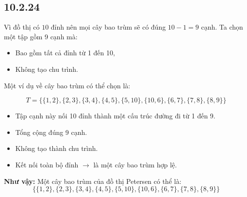 \documentclass{article}
\begin{document}
	\subsection*{10.2.24}
	Vì đồ thị có $10$ đỉnh nên mọi cây bao trùm sẽ có đúng $10 - 1 = 9$ cạnh. Ta chọn một tập gồm 9 cạnh mà:
	\begin{itemize}
		\item Bao gồm tất cả đỉnh từ 1 đến 10,
		\item Không tạo chu trình.
	\end{itemize}
	
	Một ví dụ về cây bao trùm có thể chọn là:
	
	\[
	T = \{\{1,2\}, \{2,3\}, \{3,4\}, \{4,5\}, \{5,10\}, \{10,6\}, \{6,7\}, \{7,8\}, \{8,9\}\}
	\]
	
	\begin{itemize}
		\item Tập cạnh này nối 10 đỉnh thành một cấu trúc đường đi từ 1 đến 9.
		\item Tổng cộng đúng 9 cạnh.
		\item Không tạo thành chu trình.
		\item Kết nối toàn bộ đỉnh $\rightarrow$ là một cây bao trùm hợp lệ.
	\end{itemize}
	
	\noindent \textbf{Như vậy:}
	Một cây bao trùm của đồ thị Petersen có thể là:
	\[
	\boxed{
		\{\{1,2\}, \{2,3\}, \{3,4\}, \{4,5\}, \{5,10\}, \{10,6\}, \{6,7\}, \{7,8\}, \{8,9\}\}
	}
	\]
	
\end{document}
